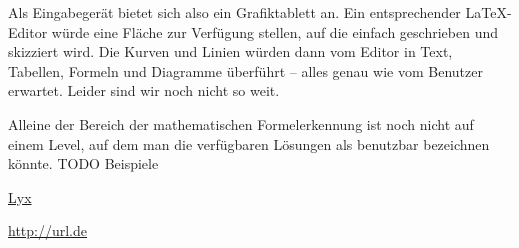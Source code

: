 Als Eingabegerät bietet sich also ein Grafiktablett an. Ein entsprechender \LaTeX-Editor würde eine Fläche zur Verfügung stellen, auf die einfach geschrieben und skizziert wird. Die Kurven und Linien würden dann vom Editor in Text, Tabellen, Formeln und Diagramme überführt -- alles genau wie vom Benutzer erwartet. Leider sind wir noch nicht so weit.

Alleine der Bereich der mathematischen Formelerkennung ist noch nicht auf einem Level, auf dem man die verfügbaren Lösungen als benutzbar bezeichnen könnte. TODO Beispiele


\href{http://lyx.org}{Lyx}

\url{http://url.de}